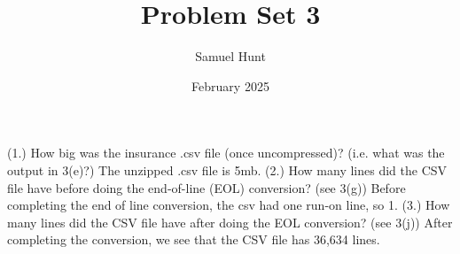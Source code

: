 \documentclass{article}
\title{Problem Set 3}
\author{Samuel Hunt}
\date{February 2025}
\begin{document}
\maketitle

\section{} 
(1.) How big was the insurance .csv file (once uncompressed)? (i.e. what was the output in 3(e)?)
\hfill \break
The unzipped .csv file is 5mb.
\hfill \break
(2.) How many lines did the CSV file have before doing the end-of-line (EOL) conversion? (see 3(g))
\hfill \break
Before completing the end of line conversion, the csv had one run-on line, so 1.
\hfill \break
(3.) How many lines did the CSV file have after doing the EOL conversion? (see 3(j))
\hfill \break
After completing the conversion, we see that the CSV file has 36,634 lines.
\end{document}
